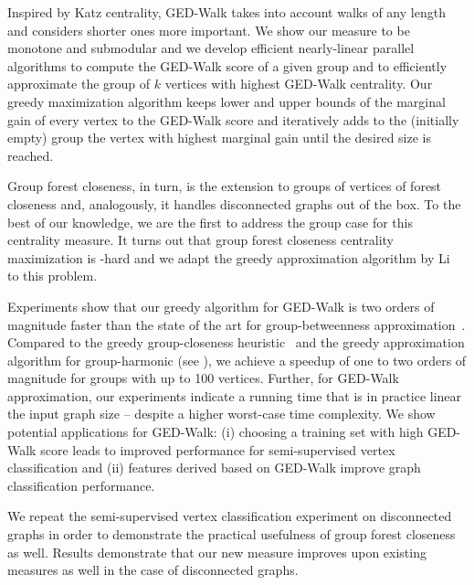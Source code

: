 Inspired by
Katz centrality, GED-Walk takes into account walks of any length and considers
shorter ones  more important. We show our measure to be monotone and
submodular and we develop efficient nearly-linear parallel algorithms to
compute the GED-Walk score of a given group and to efficiently approximate the
group of $k$ vertices with highest GED-Walk centrality. Our greedy maximization
algorithm keeps lower and upper bounds of the marginal gain of every vertex to
the GED-Walk score and iteratively adds to the (initially empty) group the
vertex with highest marginal gain until the desired size is reached.

Group forest closeness, in turn, is the extension to groups of vertices
of forest closeness and, analogously, it handles disconnected graphs out of
the box.
To the best of our knowledge, we are the first to address the group case for this
centrality measure.
It turns out that group forest closeness centrality maximization is
\np-hard and we adapt the greedy approximation algorithm by Li
\etal~\cite{DBLP:conf/www/0002PSYZ19} to this problem.

Experiments show that our greedy algorithm for GED-Walk is two orders of
magnitude faster than the state of the art for group-betweenness
approximation~\cite{DBLP:conf/kdd/MahmoodyTU16}. Compared to the greedy
group-closeness heuristic~\cite{DBLP:conf/alenex/BergaminiGM18} and the greedy
approximation algorithm for group-harmonic (see ),
we achieve a speedup of one to two orders of magnitude for groups with up to
100 vertices.
%
Further, for GED-Walk approximation, our
experiments indicate a running time that is in practice linear \wrt the input graph size
-- despite a higher worst-case time complexity.
We show potential applications for GED-Walk: (i) choosing a training set with high
GED-Walk score leads to improved performance for semi-supervised vertex classification
and (ii) features derived based on GED-Walk improve graph classification performance.

We repeat the semi-supervised vertex classification experiment on disconnected
graphs in order to demonstrate the practical usefulness of group forest closeness
as well.
Results demonstrate that our new measure improves upon existing measures as
well in the case of disconnected graphs.

